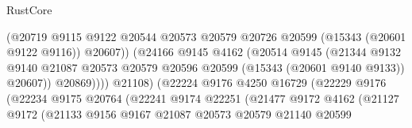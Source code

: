 \begin{lexlean}{RustCore}
\begin{coremodule}
                                          (@20719
                                            @9115
                                            @9122
                                            @20544
                                            @20573
                                            @20579
                                            @20726
                                            @20599
                                            (@15343 (@20601 @9122 @9116))
                                            @20607))
                                        (@24166
                                          @9145
                                          @4162
                                          (@20514
                                            @9145
                                            (@21344
                                              @9132
                                              @9140
                                              @21087
                                              @20573
                                              @20579
                                              @20596
                                              @20599
                                              (@15343 (@20601 @9140 @9133))
                                              @20607))
                                          @20869))))
                                  @21108)
                                (@22224
                                  @9176
                                  @4250
                                  @16729
                                  (@22229
                                    @9176
                                    (@22234
                                      @9175
                                      @20764
                                      (@22241
                                        @9174
                                        @22251
                                        (@21477
                                          @9172
                                          @4162
                                          (@21127
                                            @9172
                                            (@21133
                                              @9156
                                              @9167
                                              @21087
                                              @20573
                                              @20579
                                              @21140
                                              @20599

\end{coremodule}
\end{lexlean}
